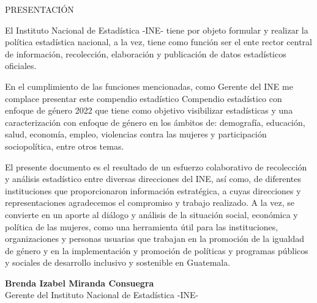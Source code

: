 \begin{center}
{\Bold \LARGE PRESENTACIÓN}\\[2cm]
\end{center}

El Instituto Nacional de Estadística -INE- tiene por objeto formular y realizar la política estadística nacional, a la vez, tiene como función ser el ente rector central de información, recolección, elaboración y publicación de datos estadísticos oficiales.  

En el cumplimiento de las funciones mencionadas, como Gerente del INE me complace presentar este compendio estadístico Compendio estadístico con enfoque de género 2022 que tiene como objetivo visibilizar estadísticas y una caracterización con enfoque de género en los ámbitos de: demografía, educación, salud, economía, empleo, violencias contra las mujeres y participación sociopolítica, entre otros temas. 

El presente documento es el resultado de un esfuerzo colaborativo de recolección y análisis estadístico entre diversas direcciones del INE, así como, de diferentes instituciones que proporcionaron información estratégica, a cuyas direcciones y representaciones agradecemos el compromiso y trabajo realizado. A la vez, se convierte en un aporte al diálogo y análisis de la situación social, económica y política de las mujeres, como una herramienta útil para las instituciones, organizaciones y personas usuarias que trabajan en la promoción de la igualdad de género y en la implementación y promoción de políticas y programas públicos y sociales de desarrollo inclusivo y sostenible en Guatemala.  

\begin{center}
\textbf{Brenda Izabel Miranda Consuegra}\\
Gerente del Instituto Nacional de Estadística -INE-
\end{center}

